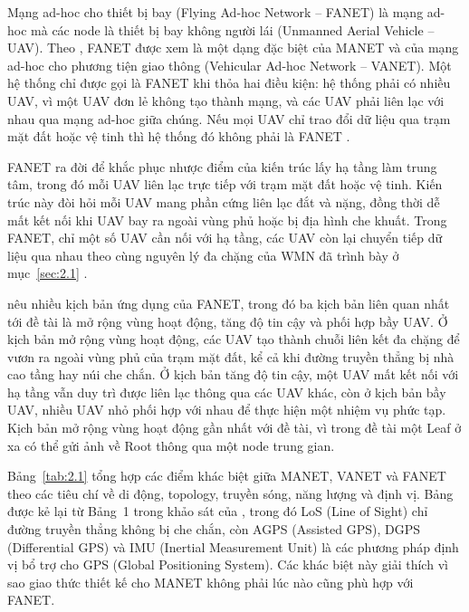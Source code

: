Mạng ad-hoc cho thiết bị bay (Flying Ad-hoc Network – FANET) là mạng ad-hoc mà các node là thiết bị bay không người lái (Unmanned Aerial Vehicle – UAV). Theo \citet{bekmezci2013}, FANET được xem là một dạng đặc biệt của MANET và của mạng ad-hoc cho phương tiện giao thông (Vehicular Ad-hoc Network – VANET). Một hệ thống chỉ được gọi là FANET khi thỏa hai điều kiện: hệ thống phải có nhiều UAV, vì một UAV đơn lẻ không tạo thành mạng, và các UAV phải liên lạc với nhau qua mạng ad-hoc giữa chúng. Nếu mọi UAV chỉ trao đổi dữ liệu qua trạm mặt đất hoặc vệ tinh thì hệ thống đó không phải là FANET \citep{bekmezci2013}.

FANET ra đời để khắc phục nhược điểm của kiến trúc lấy hạ tầng làm trung tâm, trong đó mỗi UAV liên lạc trực tiếp với trạm mặt đất hoặc vệ tinh. Kiến trúc này đòi hỏi mỗi UAV mang phần cứng liên lạc đắt và nặng, đồng thời dễ mất kết nối khi UAV bay ra ngoài vùng phủ hoặc bị địa hình che khuất. Trong FANET, chỉ một số UAV cần nối với hạ tầng, các UAV còn lại chuyển tiếp dữ liệu qua nhau theo cùng nguyên lý đa chặng của WMN đã trình bày ở mục~\ref{sec:2.1} \citep{akyildiz2005}.

\citet{bekmezci2013} nêu nhiều kịch bản ứng dụng của FANET, trong đó ba kịch bản liên quan nhất tới đề tài là mở rộng vùng hoạt động, tăng độ tin cậy và phối hợp bầy UAV. Ở kịch bản mở rộng vùng hoạt động, các UAV tạo thành chuỗi liên kết đa chặng để vươn ra ngoài vùng phủ của trạm mặt đất, kể cả khi đường truyền thẳng bị nhà cao tầng hay núi che chắn. Ở kịch bản tăng độ tin cậy, một UAV mất kết nối với hạ tầng vẫn duy trì được liên lạc thông qua các UAV khác, còn ở kịch bản bầy UAV, nhiều UAV nhỏ phối hợp với nhau để thực hiện một nhiệm vụ phức tạp. Kịch bản mở rộng vùng hoạt động gần nhất với đề tài, vì trong đề tài một Leaf ở xa có thể gửi ảnh về Root thông qua một node trung gian.

Bảng~\ref{tab:2.1} tổng hợp các điểm khác biệt giữa MANET, VANET và FANET theo các tiêu chí về di động, topology, truyền sóng, năng lượng và định vị. Bảng được kẻ lại từ Bảng~1 trong khảo sát của \citet{bekmezci2013}, trong đó LoS (Line of Sight) chỉ đường truyền thẳng không bị che chắn, còn AGPS (Assisted GPS), DGPS (Differential GPS) và IMU (Inertial Measurement Unit) là các phương pháp định vị bổ trợ cho GPS (Global Positioning System). Các khác biệt này giải thích vì sao giao thức thiết kế cho MANET không phải lúc nào cũng phù hợp với FANET.


